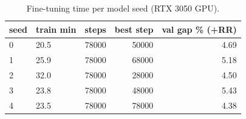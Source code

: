 \begin{table}[t]
\centering
\caption{Fine-tuning time per model seed (RTX 3050 GPU).}
\label{tab:training_time}
\scriptsize
\begin{tabular}{llrrr}
\toprule
seed & train min & steps & best step & val gap \% (+RR) \\
\midrule
0 & 20.5 & 78000 & 50000 & 4.69 \\
1 & 25.9 & 78000 & 68000 & 5.18 \\
2 & 32.0 & 78000 & 28000 & 4.50 \\
3 & 23.8 & 78000 & 48000 & 5.43 \\
4 & 23.5 & 78000 & 78000 & 4.38 \\
\bottomrule
\end{tabular}
\end{table}
